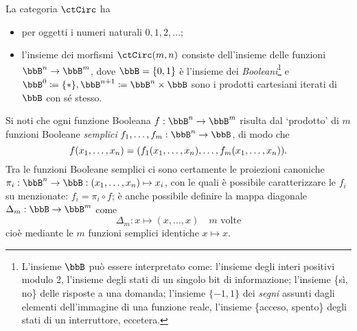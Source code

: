 \begin{example}\label{ex_cat_circuiti}
	La categoria \(\ctCirc\) ha
	\begin{itemize}
		\item per oggetti i numeri naturali \(0,1,2,\dots\);
		\item l'insieme dei morfismi \(\ctCirc(m,n)\) consiste dell'insieme delle funzioni \(\bbB^n\to \bbB^m\), dove \(\bbB=\{0,1\}\) è l'insieme dei \emph{Booleani}\footnote{L'insieme \(\bbB\) può essere interpretato come: l'insieme degli interi positivi modulo 2, l'insieme degli stati di un singolo bit di informazione; l'insieme \{sì, no\} delle risposte a una domanda; l'insieme \(\{-1,1\}\) dei \emph{segni} assunti dagli elementi dell'immagine di una funzione reale, l'insieme \{acceso, spento\} degli stati di un interruttore, eccetera.} e \(\bbB^0\defeq \{*\}, \bbB^{n+1}\defeq \bbB^n\times \bbB\) sono i prodotti cartesiani iterati di \(\bbB\) con sé stesso.
	\end{itemize}
  Si noti che ogni funzione Booleana \(f : \bbB^n\to\bbB^m\) risulta dal `prodotto' di \(m\) funzioni Booleane \emph{semplici} \(f_1,\dots,f_m : \bbB^n\to\bbB\), di modo che
	\[f(\tup xn,)=(f_1(\tup xn,),\dots,f_m(\tup xn,)).\]
	Tra le funzioni Booleane semplici ci sono certamente le proiezioni canoniche \(\pi_i : \bbB^n\to\bbB :(\tup xn,)\mapsto x_i\), con le quali è possibile caratterizzare le $f_i$ su menzionate: $f_i = \pi_i\circ f$; è anche possibile definire la mappa diagonale \(\Delta_m:\bbB\to\bbB^m\) come
	\[\Delta_m : x\mapsto (x,\dots,x)\quad m\text{ volte}\]
cioè mediante le $m$ funzioni semplici identiche $x\mapsto x$.


\end{example}
